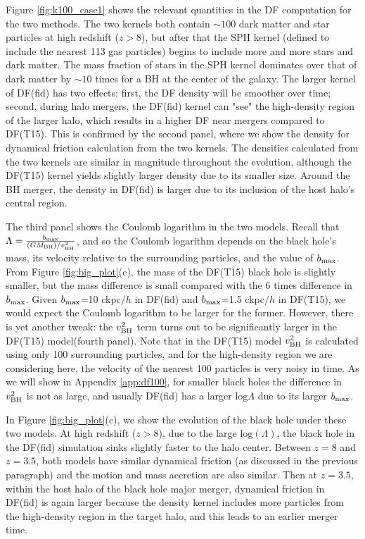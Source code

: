 Figure \ref{fig:k100_case1} shows the relevant quantities in the DF computation for the two methods. The two kernels both contain $\sim 100$ dark matter and star particles at high redshift ($z>8$), but after that the SPH kernel (defined to include the nearest 113 gas particles) begins to include more and more stars and dark matter. The mass fraction of stars in the SPH kernel dominates over that of dark matter by $\sim 10$ times for a BH at the center of the galaxy. The larger kernel of DF(fid) has two effects: first, the DF density will be smoother over time; second, during halo mergers, the DF(fid) kernel can "see" the high-density region of the larger halo, which results in a higher DF near mergers compared to DF(T15). This is confirmed by the second panel, where we show the density for dynamical friction calculation from the two kernels. The densities calculated from the two kernels are similar in magnitude throughout the evolution, although the DF(T15) kernel yields slightly larger density due to its smaller size. Around the BH merger, the density in DF(fid) is larger due to its inclusion of the host halo's central region.

The third panel shows the Coulomb logarithm in the two models. Recall that $\Lambda = \frac{b_{\rm max}}{(GM_{\rm BH})/v_{\rm BH}^2}$, and so the Coulomb logarithm depends on the black hole's mass, its velocity relative to the surrounding particles, and the value of $b_{\rm max}$. From Figure \ref{fig:big_plot}(c), the mass of the DF(T15) black hole is slightly smaller, but the mass difference is small compared with the 6 times difference in $b_{\rm max}$. Given $b_{\rm max}$=10 ckpc$/h$ in DF(fid) and $b_{\rm max}$=1.5 ckpc$/h$ in DF(T15), we would expect the Coulomb logarithm to be larger for the former. However, there is yet another tweak: the $v_{\rm BH}^2$ term turns out to be significantly larger in the DF(T15) model(fourth panel). Note that in the DF(T15) model $v_{\rm BH}^2$ is calculated using only 100 surrounding particles, and for the high-density region we are considering here, the velocity of the nearest 100 particles is very noisy in time.  As we will show in Appendix \ref{app:df100}, for smaller black holes the difference in $v_{\rm BH}^2$ is not as large, and usually DF(fid) has a larger $\text{log}\Lambda$ due to its larger $b_{\rm max}$.

In Figure \ref{fig:big_plot}(c), we show the evolution of the black hole under these two models. At high redshift ($z>8$), due to the large $\text{log}(\Lambda)$, the black hole in the DF(fid) simulation sinks slightly faster to the halo center. Between $z=8$ and $z=3.5$, both models have similar dynamical friction (as discussed in the previous paragraph) and the motion and mass accretion are also similar. Then at $z=3.5$, within the host halo of the black hole major merger, dynamical friction in DF(fid) is again larger because the density kernel includes more particles from the high-density region in the target halo, and this leads to an earlier merger time.

